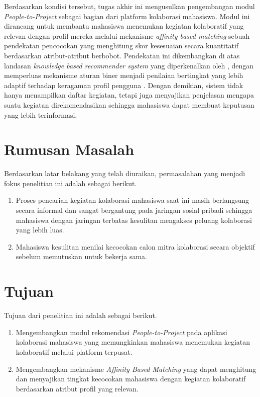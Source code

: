 Berdasarkan kondisi tersebut, tugas akhir ini mengusulkan pengembangan modul \emph{People-to-Project} sebagai bagian dari platform kolaborasi mahasiswa. Modul ini dirancang untuk membantu mahasiswa menemukan kegiatan kolaboratif yang relevan dengan profil mereka melalui mekanisme \emph{affinity based matching} sebuah pendekatan pencocokan yang menghitung skor kesesuaian secara kuantitatif berdasarkan atribut-atribut berbobot. Pendekatan ini dikembangkan di atas landasan \emph{knowledge based recommender system} yang diperkenalkan oleh \textcite{burke2002}, dengan memperluas mekanisme aturan biner menjadi penilaian bertingkat yang lebih adaptif terhadap keragaman profil pengguna \autocite{felfernig2014}. Dengan demikian, sistem tidak hanya menampilkan daftar kegiatan, tetapi juga menyajikan penjelasan mengapa suatu kegiatan direkomendasikan sehingga mahasiswa dapat membuat keputusan yang lebih terinformasi.

\section{Rumusan Masalah}

Berdasarkan latar belakang yang telah diuraikan, permasalahan yang menjadi fokus penelitian ini adalah sebagai berikut.

\begin{enumerate}
\item Proses pencarian kegiatan kolaborasi mahasiswa saat ini masih berlangsung secara informal dan sangat bergantung pada jaringan sosial pribadi sehingga mahasiswa dengan jaringan terbatas kesulitan mengakses peluang kolaborasi yang lebih luas.
\item Mahasiswa kesulitan menilai kecocokan calon mitra kolaborasi secara objektif sebelum memutuskan untuk bekerja sama.
\end{enumerate}

\section{Tujuan}

Tujuan dari penelitian ini adalah sebagai berikut.

\begin{enumerate}
\item Mengembangkan modul rekomendasi \emph{People-to-Project} pada aplikasi kolaborasi mahasiswa yang memungkinkan mahasiswa menemukan kegiatan kolaboratif melalui platform terpusat.
\item Mengembangkan mekanisme \emph{Affinity Based Matching} yang dapat menghitung dan menyajikan tingkat kecocokan mahasiswa dengan kegiatan kolaboratif berdasarkan atribut profil yang relevan.
\end{enumerate}

